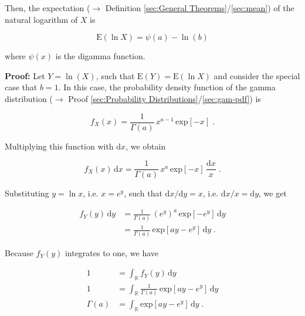 \documentclass[a4paper,12pt,twoside]{book}
\begin{document}
Then, the expectation ($\rightarrow$ Definition \ref{sec:General Theorems}/\ref{sec:mean}) of the natural logarithm of $X$ is

\begin{equation} \label{eq:gam-logmean-gam-logmean}
\mathrm{E}(\ln X) = \psi(a) - \ln(b)
\end{equation}

where $\psi(x)$ is the digamma function.


\vspace{1em}
\textbf{Proof:} Let $Y = \ln(X)$, such that $\mathrm{E}(Y) = \mathrm{E}(\ln X)$ and consider the special case that $b = 1$. In this case, the probability density function of the gamma distribution ($\rightarrow$ Proof \ref{sec:Probability Distributions}/\ref{sec:gam-pdf}) is

\begin{equation} \label{eq:gam-logmean-X-pdf-s1}
f_X(x) = \frac{1}{\Gamma(a)} \, x^{a-1} \, \mathrm{exp} [-x] \; .
\end{equation}

Multiplying this function with $\mathrm{d}x$, we obtain

\begin{equation} \label{eq:gam-logmean-X-pdf-s2}
f_X(x) \, \mathrm{d}x = \frac{1}{\Gamma(a)} \, x^a \, \mathrm{exp} [-x] \, \frac{\mathrm{d}x}{x} \; .
\end{equation}

Substituting $y = \ln x$, i.e. $x = e^y$, such that $\mathrm{d}x/\mathrm{d}y = x$, i.e. $\mathrm{d}x/x = \mathrm{d}y$, we get

\begin{equation} \label{eq:gam-logmean-Y-pdf-s1}
\begin{split}
f_Y(y) \, \mathrm{d}y &= \frac{1}{\Gamma(a)} \, \left( e^y \right)^a \, \mathrm{exp} [-e^y] \, \mathrm{d}y \\
&= \frac{1}{\Gamma(a)} \, \mathrm{exp}\left[ ay - e^y \right] \, \mathrm{d}y \; .
\end{split}
\end{equation}

Because $f_Y(y)$ integrates to one, we have

\begin{equation} \label{eq:gam-logmean-Y-pdf-s2}
\begin{split}
1 &= \int_{\mathbb{R}} f_Y(y) \, \mathrm{d}y \\
1 &= \int_{\mathbb{R}} \frac{1}{\Gamma(a)} \, \mathrm{exp}\left[ ay - e^y \right] \, \mathrm{d}y \\
\Gamma(a) &= \int_{\mathbb{R}} \mathrm{exp}\left[ ay - e^y \right] \, \mathrm{d}y \; .
\end{split}
\end{equation}
\end{document}
